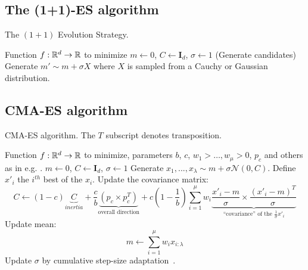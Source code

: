 \subsection{The (1+1)-ES algorithm}
\begin{algorithm}
\caption{\label{opo}The $(1+1)$ Evolution Strategy.}
\begin{algorithmic}
\REQUIRE Function $f:\mathbb{R}^d\to\mathbb{R}$ to minimize%
\STATE $m\leftarrow 0$, $C\leftarrow \boldsymbol{I}_d$, $\sigma\leftarrow 1$
\STATE (Generate candidates)
\STATE Generate $m' \sim m+\sigma X$ where $X$ is sampled from a Cauchy or Gaussian distribution.
\ELSE
{}
\ENDIF
\ENDFOR
\end{algorithmic}
\end{algorithm}
\newpage
\subsection{CMA-ES algorithm}
\begin{algorithm}
\caption{\label{cmaalg}CMA-ES algorithm. The $T$ subscript denotes transposition.}
\begin{algorithmic}
\REQUIRE Function $f:\mathbb{R}^d\to\mathbb{R}$ to minimize, parameters $b$, $c$, $w_1>\dots,w_\mu>0$, $p_c$ and others as in e.g. \citep{HAN}.%
\STATE $m\leftarrow 0$, $C\leftarrow \boldsymbol{I}_d$, $\sigma\leftarrow 1$
\STATE Generate $x_1,...,x_\lambda \sim m + \sigma \mathcal{N}(0,C)$.
\STATE Define $x'_{i}$ the $i^{th}$ best of the $x_i$.
\STATE Update the covariance matrix:
$$C\leftarrow (1-c)\underbrace{C}_{inertia}+\frac cb \underbrace{(p_c\times p_c^T)}_{\mbox{overall direction}} +c(1-\frac 1b)\sum_{i=1}^\mu w_i\underbrace{\frac{x'_i-m}\sigma\times \frac{(x'_i-m)^T}\sigma}_{\mbox{``covariance'' of the $\frac1\sigma x'_i$}}$$
\STATE Update mean:%
$$m\leftarrow \sum_{i=1}^\mu w_i x_{i:\lambda}$$
\STATE Update $\sigma$ by cumulative step-size adaptation~\citep{csalinear}.
\ENDFOR
\end{algorithmic}
\end{algorithm}
\newpage
